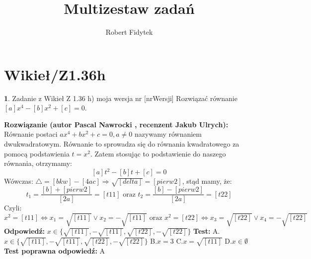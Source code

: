 \documentclass[12pt, a4paper]{article}
\title{Multizestaw zadań}
\author{Robert Fidytek}
\date{}
\theoremstyle{definition} %
\newtheorem{zad}{}
\newcommand{\kategoria}[1]{\section{#1}} %
\newcommand{\zadStart}[1]{\begin{zad}#1\newline} %
\newcommand{\zadStop}{\end{zad}}   %
\newcommand{\rozwStart}[2]{\noindent \textbf{Rozwiązanie (autor #1 , recenzent #2): }\newline} %
\newcommand{\rozwStop}{\newline}                                            %
\newcommand{\odpStart}{\noindent \textbf{Odpowiedź:}\newline}    %
\newcommand{\odpStop}{\newline}                                             %
\newcommand{\testStart}{\noindent \textbf{Test:}\newline} %
\newcommand{\testStop}{\newline} %
\newcommand{\kluczStart}{\noindent \textbf{Test poprawna odpowiedź:}\newline} %
\newcommand{\kluczStop}{\newline} %
\begin{document}
\maketitle


\kategoria{Wikieł/Z1.36h}
\zadStart{Zadanie z Wikieł Z 1.36 h) moja wersja nr [nrWersji]}
Rozwiązać równanie $[a]x^4-[b]x^2+[c]=0$.
\zadStop
\rozwStart{Pascal Nawrocki}{Jakub Ulrych}
Równanie postaci $ax^4+bx^2+c=0, a\neq0$ nazywamy równaniem dwukwadratowym. Równanie to sprowadza się do równania kwadratowego za pomocą podstawienia $t=x^2$. Zatem stosując to podstawienie do naszego równania, otrzymamy: $$ [a]t^2-[b]t+[c]=0$$
Wówczas: $\bigtriangleup=[bkw]-[4ac]\Rightarrow\sqrt{[delta]}=[pierw2]$, stąd mamy, że:
$$t_1=\frac{[b]+[pierw2]}{[2a]}=[t11] \text{ oraz } t_2=\frac{[b]-[pierw2]}{[2a]}=[t22]$$
Czyli:
$$x^2={[t11]}\Leftrightarrow x_1=\sqrt{[t11]} \vee x_2=-\sqrt{[t11]} \text{ oraz } x^2=[t22]\Leftrightarrow x_3=\sqrt{[t22]} \vee x_4=-\sqrt{[t22]}$$
\rozwStop
\odpStart
$x\in\{\sqrt{[t11]},-\sqrt{[t11]},\sqrt{[t22]},-\sqrt{[t22]}\}$
\odpStop
\testStart
A.$x\in\{\sqrt{[t11]},-\sqrt{[t11]},\sqrt{[t22]},-\sqrt{[t22]}\}$
B.$x=3$
C.$x=\sqrt{[t11]}$
D.$x\in \emptyset$
\testStop
\kluczStart
A
\kluczStop
\end{document}
